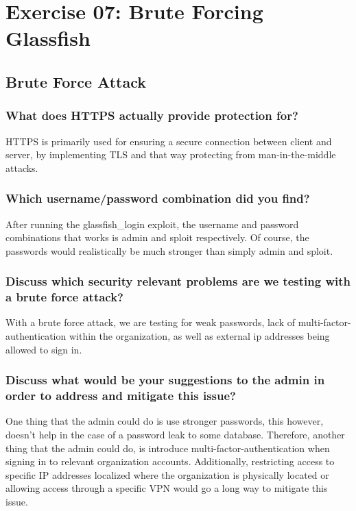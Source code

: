 \section{Exercise 07: Brute Forcing Glassfish}
\subsection{Brute Force Attack}
\subsubsection{What does HTTPS actually provide protection for?}
HTTPS is primarily used for ensuring a secure connection between client and server, by implementing TLS and that way protecting from man-in-the-middle attacks.
\subsubsection{Which username/password combination did you find?}
After running the glassfish\_login exploit, the username and password combinations that works is admin and sploit respectively. Of course, the passwords would realistically be much stronger than simply admin and sploit.

\subsubsection{Discuss which security relevant problems are we
    testing with a brute force attack?}
With a brute force attack, we are testing for weak passwords, lack of multi-factor-authentication within the organization, as well as external ip addresses being allowed to sign in.
\subsubsection{Discuss what would be your suggestions to the admin
    in order to address and mitigate this issue?}
One thing that the admin could do is use stronger passwords, this however, doesn't help in the case of a password leak to some database. Therefore, another thing that the admin could do, is introduce multi-factor-authentication when signing in to relevant organization accounts. Additionally, restricting access to specific IP addresses localized where the organization is physically located or allowing access through a specific VPN would go a long way to mitigate this issue.
